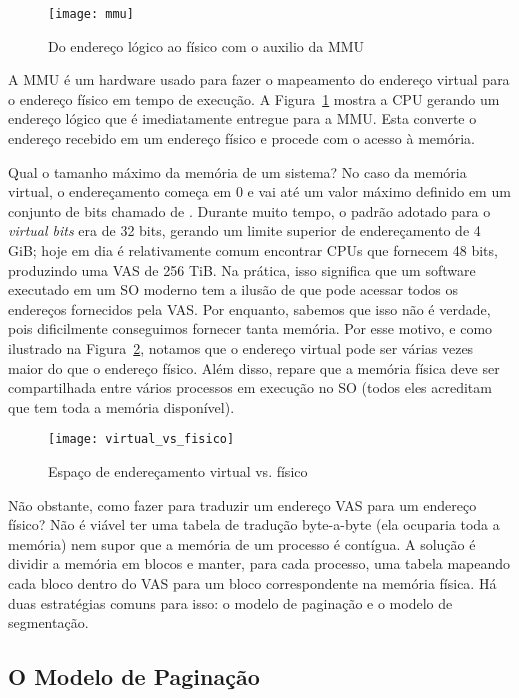 \begin{figure}[!h]
  \centering
  \texttt{[image: mmu]} 
  \caption{Do endereço lógico ao físico com o auxilio da MMU}
  \label{fig:mmu}
\end{figure}

A MMU é um hardware usado para fazer o mapeamento do endereço virtual para o
endereço físico em tempo de execução. A Figura~\ref{fig:mmu} mostra a CPU
gerando um endereço lógico que é imediatamente entregue para a MMU. Esta
converte o endereço recebido em um endereço físico e procede com o acesso à
memória.

Qual o tamanho máximo da memória de um sistema?  No caso da memória virtual, o
endereçamento começa em 0 e vai até um valor máximo definido em um conjunto de
bits chamado de . Durante muito tempo, o padrão
adotado para o \emph{virtual bits} era de 32 bits, gerando um limite superior
de endereçamento de 4 GiB; hoje em dia é relativamente comum encontrar CPUs que
fornecem 48 bits, produzindo uma VAS de 256 TiB. Na prática, isso significa
que um software executado em um SO moderno tem a ilusão de que pode acessar
todos os endereços fornecidos pela VAS. Por enquanto, sabemos que isso não é
verdade, pois dificilmente conseguimos fornecer tanta memória. Por esse motivo,
e como ilustrado na Figura~\ref{fig:vas_pas}, notamos que o endereço virtual
pode ser várias vezes maior do que o endereço físico. Além disso, repare que a
memória física deve ser compartilhada entre vários processos em execução no SO
(todos eles acreditam que tem toda a memória disponível).

\begin{figure}[!h]
  \centering
  \texttt{[image: virtual\_vs\_fisico]} 
  \caption{Espaço de endereçamento virtual vs. físico}
  \label{fig:vas_pas}
\end{figure}


Não obstante, como fazer para traduzir um endereço VAS para um endereço físico?
Não é viável ter uma tabela de tradução byte-a-byte (ela ocuparia toda a
memória) nem supor que a memória de um processo é contígua. A solução é
dividir a memória em blocos e manter, para cada processo, uma tabela mapeando
cada bloco dentro do VAS para um bloco correspondente na memória física. Há
duas estratégias comuns para isso: o modelo de paginação e o modelo de
segmentação.

\subsection{O Modelo de Paginação}
\label{sec:modelopaginacao}

